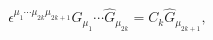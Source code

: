 \begin{equation}
\epsilon^{\mu_{1}\cdots \mu_{2k}\mu_{2k+1}}
\hat{G}_{\mu_{1}} \cdots 
\hat{G}_{\mu_{2k}}
=C_{k}\hat{G}_{\mu_{2k+1}},  
\label{fuzzyrelation}
\end{equation}

